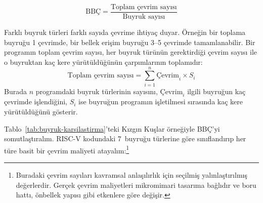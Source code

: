 \begin{equation}
\text{BBÇ} = \frac{\text{Toplam çevrim sayısı}}{\text{Buyruk sayısı}}
\label{eq:bbc}
\end{equation}

Farklı buyruk türleri farklı sayıda çevrime ihtiyaç duyar. Örneğin bir toplama buyruğu 1 çevrimde, bir bellek erişim buyruğu 3--5 çevrimde tamamlanabilir. Bir programın toplam çevrim sayısı, her buyruk türünün gerektirdiği çevrim sayısı ile o buyruktan kaç kere yürütüldüğünün çarpımlarının toplamıdır:
\begin{equation}
\text{Toplam çevrim sayısı} = \sum_{i=1}^{n} \text{Çevrim}_i \times S_i
\label{eq:toplam-cevrim}
\end{equation}
Burada $n$ programdaki buyruk türlerinin sayısını, $\text{Çevrim}_i$ ilgili buyruğun kaç çevrimde işlendiğini, $S_i$ ise buyruğun programın işletilmesi sırasında kaç kere yürütüldüğünü gösterir.

Tablo~\ref{tab:buyruk-karsilastirma}'teki Kızgın Kuşlar örneğiyle BBÇ'yi somutlaştıralım. RISC-V kodundaki 7~buyruğu türlerine göre sınıflandırıp her türe basit bir çevrim maliyeti atayalım:\footnote{Buradaki çevrim sayıları kavramsal anlaşılırlık için seçilmiş yalınlaştırılmış değerlerdir. Gerçek çevrim maliyetleri mikromimari tasarıma bağlıdır ve boru hattı, önbellek yapısı gibi etkenlere göre değişir.}

